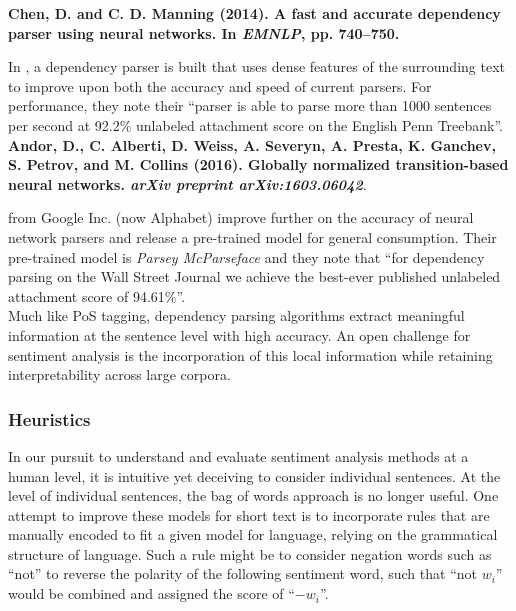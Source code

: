 {\noindent \textbf{Chen, D. and C. D. Manning (2014). A fast and accurate dependency parser using neural networks. In \textit{EMNLP}, pp. 740–750.}

\noindent In \cite{chen2014fast}, a dependency parser is built that uses dense features of the surrounding text to improve upon both the accuracy and speed of current parsers.
For performance, they note their ``parser is able to parse more than 1000 sentences per second at 92.2\% unlabeled attachment score on the English Penn Treebank''.\\

\noindent \textbf{Andor, D., C. Alberti, D. Weiss, A. Severyn, A. Presta, K. Ganchev, S. Petrov, and M. Collins (2016). Globally normalized transition-based neural networks. \textit{arXiv preprint arXiv:1603.06042}}.

\noindent \cite{andor2016globally} from Google Inc. (now Alphabet) improve further on the accuracy of neural network parsers and release a pre-trained model for general consumption.
Their pre-trained model is \textit{Parsey McParseface} and they note that ``for dependency parsing on the Wall Street Journal we achieve the best-ever published unlabeled attachment score of 94.61\%''.\\

Much like PoS tagging, dependency parsing algorithms extract meaningful information at the sentence level with high accuracy.
An open challenge for sentiment analysis is the incorporation of this local information while retaining interpretability across large corpora.

\subsubsection{Heuristics}

In our pursuit to understand and evaluate sentiment analysis methods at a human level, it is intuitive yet deceiving to consider individual sentences.
At the level of individual sentences, the bag of words approach is no longer useful.
One attempt to improve these models for short text is to incorporate rules that are manually encoded to fit a given model for language, relying on the grammatical structure of language.
Such a rule might be to consider negation words such as ``not'' to reverse the polarity of the following sentiment word, such that ``not $w_i$'' would be combined and assigned the score of ``$-w_i$''.

}
